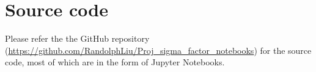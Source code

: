 \chapter{Source code} 

Please refer the the GitHub repository
(\url{https://github.com/RandolphLiu/Proj_sigma_factor_notebooks})
for the source code, most of which are in the form
of Jupyter Notebooks.
